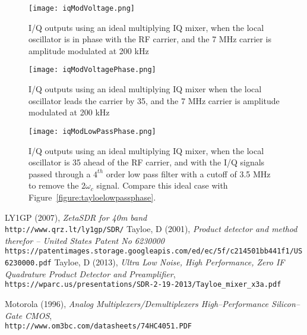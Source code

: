 \documentclass[11pt, twoside]{article}
\begin{document}
\begin{figure}
  \center \captionsetup{width=.8\linewidth}
  \texttt{[image: iqModVoltage.png]}
  \caption{I/Q outputs using an ideal multiplying IQ mixer, when the
    local oscillator is in phase with the RF carrier, and the 7 MHz
    carrier is amplitude modulated at 200 kHz}
  \label{figure:iqmod}
\end{figure}


\begin{figure}
  \center
    \captionsetup{width=.8\linewidth}
  \texttt{[image: iqModVoltagePhase.png]}
  \caption{I/Q outputs using an ideal multiplying IQ mixer when the
    local oscillator leads the carrier by 35{\degree}, and the 7 MHz
    carrier is amplitude modulated at 200 kHz}
  \label{figure:iqmodphase}
\end{figure}


\begin{figure}
  \center
    \captionsetup{width=.8\linewidth}
  \texttt{[image: iqModLowPassPhase.png]}
  \caption{I/Q outputs using an ideal multiplying IQ mixer, when the
    local oscillator is 35{\degree} ahead of the RF carrier, and with
    the I/Q signals passed through a $4^{th}$ order low pass filter
    with a cutoff of 3.5 MHz to remove the $2{\omega_c}$ signal.
    Compare this ideal case with
    Figure~\ref{figure:tayloelowpassphase}.}
  \label{figure:iqmodlowpassphase}
\end{figure}

\begin{thebibliography}{9}
  LY1GP (2007), {\it ZetaSDR for 40m band}
  \\\texttt{http://www.qrz.lt/ly1gp/SDR/}
  Tayloe, D (2001), {\it Product detector and method therefor -- United States Patent No 6230000}
  \\\texttt{https://patentimages.storage.googleapis.com/ed/ec/5f/c214501bb441f1/US6230000.pdf}
  Tayloe, D (2013), {\it Ultra Low Noise, High Performance, Zero IF Quadrature Product Detector and Preamplifier},
  \\\texttt{https://wparc.us/presentations/SDR-2-19-2013/Tayloe\_mixer\_x3a.pdf}

  Motorola (1996),
  {\it Analog Multiplexers/Demultiplexers High–Performance Silicon–Gate CMOS},
\\\texttt{http://www.om3bc.com/datasheets/74HC4051.PDF}
  
\end{thebibliography}
\end{document}
